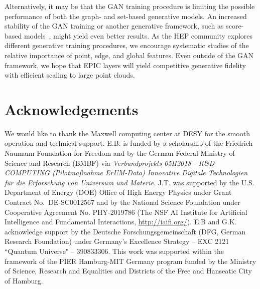 \documentclass[a4paper,submission, Phys]{SciPost}
\begin{document}
Alternatively, it may be that the GAN training procedure is limiting  the possible performance of both the graph- and set-based generative models.
%
An increased stability of the GAN training or another generative framework, such as score-based models~\cite{score_models_2011.13456}, might yield even better results. 
%
As the HEP community explores different generative training procedures, we encourage systematic studies of the relative importance of point, edge, and global features.
%
Even outside of the GAN framework, we hope that EPIC layers will yield competitive generative fidelity with efficient scaling to large point clouds. 



\section*{Acknowledgements}

We would like to thank the Maxwell computing
center at DESY for the smooth operation and technical support.
%
E.B. is funded by a scholarship of the Friedrich Naumann Foundation for Freedom and by the German Federal Ministry of Science and Research (BMBF) via \textit{Verbundprojekts 05H2018 - R\&D COMPUTING (Pilot\-maß\-nah\-me ErUM-Data) Innovative Digitale Technologien f\"ur die Erforschung von Universum und Materie}.
%
J.T. was supported by the U.S. Department of Energy (DOE) Office of High Energy Physics under Grant Contract No.~DE-SC0012567 and by the National Science Foundation under Cooperative Agreement No. PHY-2019786 (The NSF AI Institute for Artificial Intelligence and Fundamental Interactions, \url{http://iaifi.org/}).
%
E.B and G.K. acknowledge support by the Deutsche Forschungsgemeinschaft (DFG, German Re\-search Foundation) under Germany’s Excellence Strategy – EXC 2121  ``Quantum Universe" – 390833306.  
This work was supported within the framework of the PIER Hamburg-MIT Germany program funded by the Ministry of Science, Research and Equalities and Districts of the Free and Hanseatic City of Hamburg.




\nolinenumbers
\end{document}
